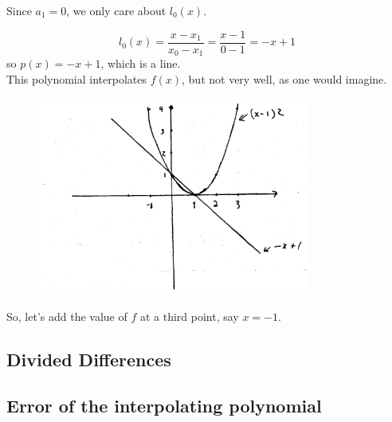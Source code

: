 \noindent Since $a_1 = 0$, we only care about $l_0(x)$.

\begin{equation*}
    l_0 (x) = \frac{x-x_1}{x_0-x_1} = \frac{x-1}{0-1} = -x + 1
\end{equation*}
so $p(x) = -x + 1$, which is a line. \\

\noindent This polynomial interpolates $f(x)$, but not very well, as one would imagine.

\begin{figure}[H]
    \centering
    \includegraphics[width=0.8\textwidth]{figures/chap_03/polynomial-1.png}
    \label{fig:polynomial-1}
\end{figure}
So, let's add the value of $f$ at a third point, say $x=-1$. 

\subsection{Divided Differences}

\subsection{Error of the interpolating polynomial}